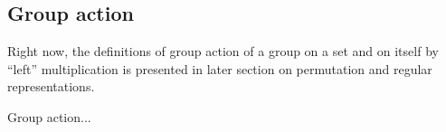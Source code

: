 \subsection{Group action}

	Right now, the definitions of group action of a group on a set and on itself by ``left'' multiplication is presented in later section on permutation and regular representations.

\begin{definition}
	Group action...
\end{definition}
